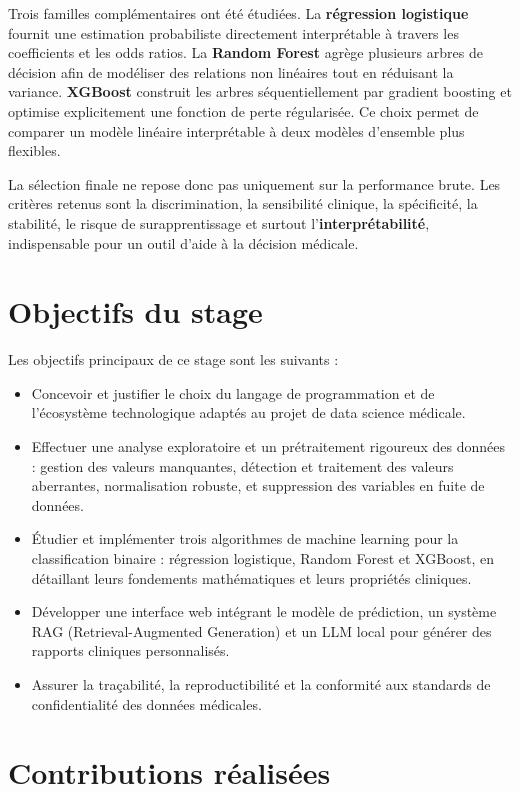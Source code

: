 \documentclass[12pt,a4paper]{report}
\begin{document}
Trois familles complémentaires ont été étudiées. La \textbf{régression logistique} fournit
une estimation probabiliste directement interprétable à travers les coefficients et les
odds ratios. La \textbf{Random Forest} agrège plusieurs arbres de décision afin de modéliser
des relations non linéaires tout en réduisant la variance. \textbf{XGBoost} construit les
arbres séquentiellement par gradient boosting et optimise explicitement une fonction de
perte régularisée. Ce choix permet de comparer un modèle linéaire interprétable à deux
modèles d'ensemble plus flexibles.

La sélection finale ne repose donc pas uniquement sur la performance brute. Les critères
retenus sont la discrimination, la sensibilité clinique, la spécificité, la stabilité, le
risque de surapprentissage et surtout l'\textbf{interprétabilité}, indispensable pour un
outil d'aide à la décision médicale.


\section{Objectifs du stage}

Les objectifs principaux de ce stage sont les suivants :

\begin{itemize}[leftmargin=1.5em]
 \item Concevoir et justifier le choix du langage de programmation et de l'écosystème technologique adaptés au projet de data science médicale.
 \item Effectuer une analyse exploratoire et un prétraitement rigoureux des données : gestion des valeurs manquantes, détection et traitement des valeurs aberrantes, normalisation robuste, et suppression des variables en fuite de données.
 \item Étudier et implémenter trois algorithmes de machine learning pour la classification binaire : régression logistique, Random Forest et XGBoost, en détaillant leurs fondements mathématiques et leurs propriétés cliniques.
 \item Développer une interface web intégrant le modèle de prédiction, un système RAG (Retrieval-Augmented Generation) et un LLM local pour générer des rapports cliniques personnalisés.
 \item Assurer la traçabilité, la reproductibilité et la conformité aux standards de confidentialité des données médicales.
\end{itemize}

\section{Contributions réalisées}
\end{document}
